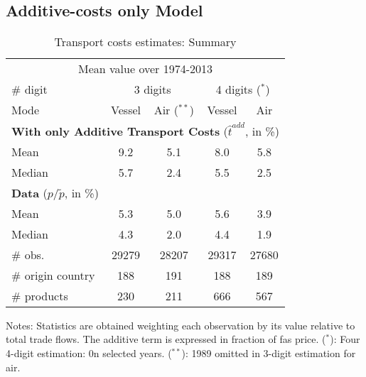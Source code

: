 \documentclass[11pt,twoside, authoryear]{elsarticle}
\begin{document}
	\renewcommand\thesubsubsection{\Alph{subsection}.\arabic{subsubsection}}
	
	\renewcommand\thesubsection{\Alph{subsection}}
	
	
\subsection{Additive-costs only Model \label{secoa:additive_only}}

\setcounter{table}{0}
\renewcommand{\thetable}{A.\arabic{table}}


\begin{table}[htbp]
  \centering
  \footnotesize{
  \caption{Transport costs estimates: Summary \label{sec_oa:add_only}}
  \begin{center}
    \begin{tabular}{l|cc|cc}
      \hline \hline
    \multicolumn{5}{c}{Mean value over 1974-2013}   \\
    \# digit & \multicolumn{2}{c}{3 digits} & \multicolumn{2}{c}{4 digits ($^\ast$)} \\ \hline
    Mode  & Vessel & Air ($^{\ast \ast}$) & Vessel & Air \\ \hline
    \multicolumn{5}{l}{\textbf{With only Additive Transport Costs} ($\widehat{t}^{add}$, in \%)}  \\ \hline
    Mean  & 9.2 & 5.1 & 8.0 & 5.8 \\
    Median & 5.7 & 2.4 & 5.5 & 2.5 \\ \hline
 
       \multicolumn{5}{l}{\textbf{Data} ($p/\widetilde{p}$, in \%) } \\ \hline
        Mean & 5.3 & 5.0& 5.6&3.9 \\
        Median & 4.3 & 2.0 & 4.4& 1.9 \\ \hline
        \# obs. & 29279 & 28207 & 29317 & 27680 \\
    \# origin country & 188 & 191 & 188 & 189 \\
    \# products & 230 & 211 & 666 & 567 \\  \hline \hline
  \end{tabular}
    \end{center}}
\parbox[l]{10cm}{\tiny{Notes: Statistics are obtained weighting each observation by its value relative to total trade flows. The additive term is expressed in fraction of fas price. ($^\ast$): Four 4-digit estimation: 0n selected years. ($^{\ast \ast}$): 1989 omitted in 3-digit estimation for air.}}
\end{table}%
\end{document}
